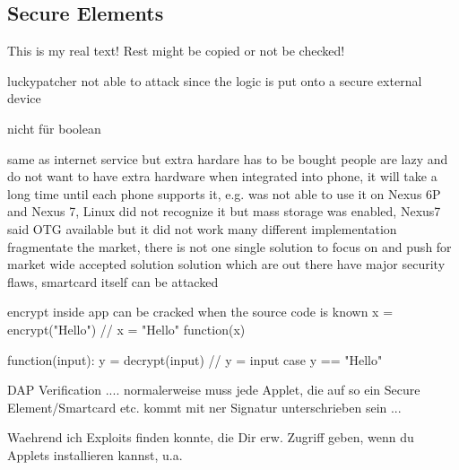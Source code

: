 \subsection{Secure Elements}\label{subsection:evaluation-external-secure}
This is my real text! Rest might be copied or not be checked!

luckypatcher not able to attack since the logic is put onto a secure external device

nicht für boolean

same as internet service but extra hardare has to be bought
people are lazy and do not want to have extra hardware
when integrated into phone, it will take a long time until each phone supports it, e.g. was not able to use it on Nexus 6P and Nexus 7, Linux did not recognize it but mass storage was enabled, Nexus7 said OTG available but it did not work
many different implementation fragmentate the market, there is not one single solution to focus on and push for market wide accepted solution
solution which are out there have major security flaws, smartcard itself can be attacked

encrypt inside app can be cracked when the source code is known
x = encrypt("Hello") // x = "Hello"
function(x)

function(input):
y = decrypt(input) // y = input
case y == "Hello"


DAP Verification .... normalerweise muss jede Applet, die auf so ein Secure Element/Smartcard etc. kommt mit ner Signatur unterschrieben sein ...


Waehrend ich Exploits finden konnte, die Dir erw. Zugriff geben, wenn du Applets installieren kannst, u.a.
